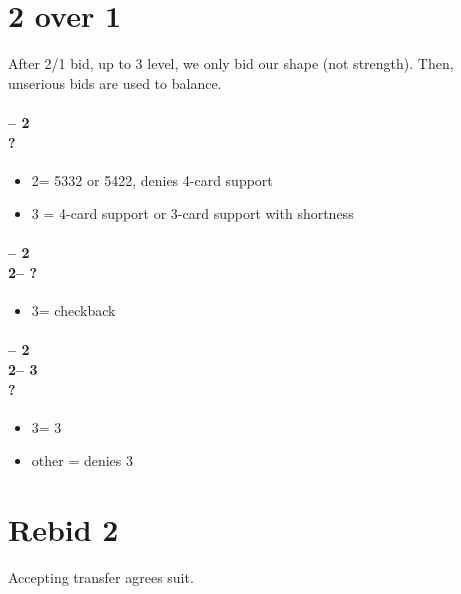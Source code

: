 \documentclass[12pt, a4paper]{report}
\begin{document}
{    \chapter*{\colorbox{Plum!30}{2 over 1 \gf}}
     {
        After 2/1 bid, up to 3 level, we only bid our shape (not strength).
        Then, unserious bids are used to balance.

        \subsubsection*{ -- 2 \\ ?}
        \begin{itemize}
            \item 2\nt = 5332 or 5422, denies 4-card support
            \item 3 = 4-card support or 3-card support with shortness
        \end{itemize}

        \subsubsection*{ -- 2 
                        \\ 2\nt -- ?}
        \begin{itemize}
            \item 3\clubs = checkback
        \end{itemize}

        \subsubsection*{ -- 2 
                        \\ 2\nt -- 3\clubs \\ ?}
        \begin{itemize}
            \item 3\diams = 3 \imp
            \item other = denies 3
        \end{itemize}
    }

    \chapter*{\colorbox{Plum!30}{Rebid 2\ntch}}
     {
        Accepting transfer agrees suit.

}}
\end{document}
